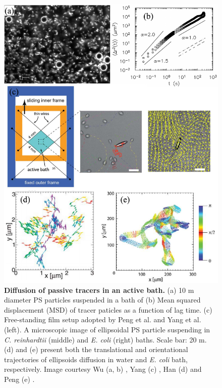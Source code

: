 \begin{figure}[!htbp]
	\begin{center}
	\includegraphics[width=5.5 in]{Figs/1-Intro/3.pdf}
	\end{center}
	\caption[Figure 1.3:]
	{
	\textbf{Diffusion of passive tracers in an active bath.}
	(a) 10 \textmu m diameter PS particles suspended in a bath of 
	(b) Mean squared displacement (MSD) of tracer paticles as a function of lag time.
	(c) Free-standing film setup adopted by Peng et al. and Yang et al. (left)\cite{Peng2016, Yang2016}. A microscopic image of ellipsoidal PS particle suspending in \textit{C. reinhardtii} (middle) and \textit{E. coli} (right) baths. Scale bar: 20 \textmu m.
	(d) and (e) present both the translational and orientational trajectories of ellipsoids diffusion in water and \textit{E. coli} bath, respectively.
	Image courtesy Wu (a, b) \cite{Wu2000}, Yang (c) \cite{Yang2016}, Han (d) \cite{Han2006} and Peng (e) \cite{Peng2016}.
	}
	\label{fig:1-3}
\end{figure}



